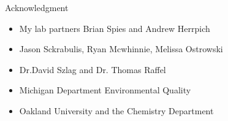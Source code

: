 \begin{frame}{Acknowledgment}

	\begin{itemize}
		\item My lab partners Brian Spies and Andrew Herrpich
		\item Jason Sckrabulis, Ryan Mcwhinnie, Melissa Ostrowski
		\item Dr.David Szlag and Dr. Thomas Raffel
		\item Michigan Department Environmental Quality
		\item Oakland University and the Chemistry Department
	\end{itemize}

\end{frame}
